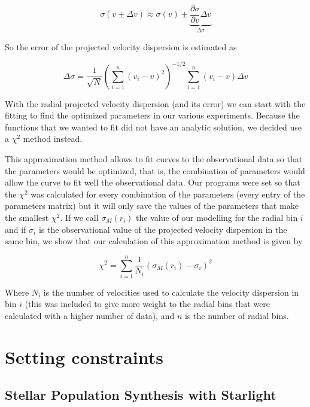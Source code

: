 \begin{equation}
\sigma(v\pm\Delta v)\approx \sigma(v)\pm \underbrace{\frac{\partial \sigma}{\partial v}\Delta v}_{\Delta \sigma}
\end{equation}

So the error of the projected velocity dispersion is estimated as

\begin{equation}
\Delta \sigma = \frac{1}{\sqrt{N}}\left(\sum_{i=1}^{n}\left(v_{i}-v\right)^{2}\right)^{-1/2}\sum_{i=1}^{n}\left(v_{i}-v\right)\Delta v
\end{equation}

With the radial projected velocity dispersion (and its error) we can start with the fitting to find the optimized parameters in our various experiments. Because the functions that we wanted to fit did not have an analytic solution, we decided use a $\chi^{2}$ method instead. 

This approximation method allows to fit curves to the observational data so that the parameters would be optimized, that is, the combination of parameters would allow the curve to fit well the observational data. Our programs were set so that the $\chi^{2}$ was calculated for every combination of the parameters (every entry of the parameters matrix) but it will only save the values of the parameters that make the smallest $\chi^{2}$. If we call $\sigma_{M}(r_{i})$ the value of our modelling for the radial bin $i$ and if $\sigma_{i}$ is the observational value of the projected velocity dispersion in the same bin, we show that our calculation of this approximation method is given by 

\begin{equation}
\chi^{2}=\sum_{i=1}^{n}\frac{1}{N_{i}}{\left(\sigma_{M}\left(r_{i}\right)-\sigma_{i}\right)}^{2}
\end{equation}

Where $N_{i}$ is the number of velocities used to calculate the velocity dispersion in bin $i$ (this was included to give more weight to the radial bins that were calculated with a higher number of data), and $n$ is the number of radial bins.

\section{Setting constraints}

\subsection{Stellar Population Synthesis with Starlight}

